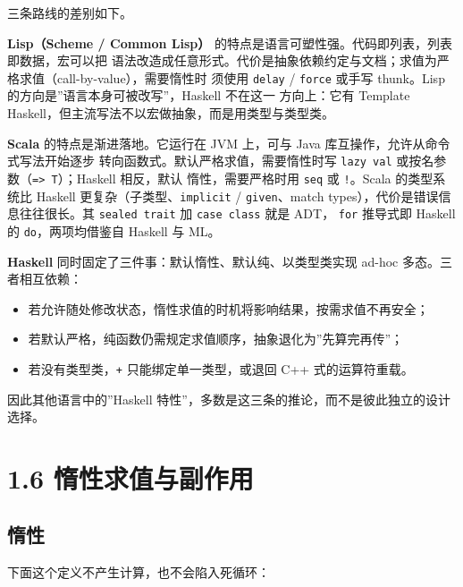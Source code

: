 三条路线的差别如下。

\textbf{Lisp（Scheme / Common Lisp）} 的特点是语言可塑性强。代码即列表，列表即数据，宏可以把
语法改造成任意形式。代价是抽象依赖约定与文档；求值为严格求值（call-by-value），需要惰性时
须使用 \passthrough{\lstinline!delay!} / \passthrough{\lstinline!force!} 或手写 thunk。Lisp 的方向是''语言本身可被改写''，Haskell 不在这一
方向上：它有 Template Haskell，但主流写法不以宏做抽象，而是用类型与类型类。

\textbf{Scala} 的特点是渐进落地。它运行在 JVM 上，可与 Java 库互操作，允许从命令式写法开始逐步
转向函数式。默认严格求值，需要惰性时写 \passthrough{\lstinline!lazy val!} 或按名参数（\passthrough{\lstinline!=> T!}）；Haskell 相反，默认
惰性，需要严格时用 \passthrough{\lstinline!seq!} 或 \passthrough{\lstinline"!"}。Scala 的类型系统比 Haskell 更复杂（子类型、\passthrough{\lstinline!implicit!} /
\passthrough{\lstinline!given!}、match types），代价是错误信息往往很长。其 \passthrough{\lstinline!sealed trait!} 加 \passthrough{\lstinline!case class!} 就是 ADT，
\passthrough{\lstinline!for!} 推导式即 Haskell 的 \passthrough{\lstinline!do!}，两项均借鉴自 Haskell 与 ML。

\textbf{Haskell} 同时固定了三件事：默认惰性、默认纯、以类型类实现 ad-hoc 多态。三者相互依赖：

\begin{itemize}
\tightlist
\item
  若允许随处修改状态，惰性求值的时机将影响结果，按需求值不再安全；
\item
  若默认严格，纯函数仍需规定求值顺序，抽象退化为''先算完再传''；
\item
  若没有类型类，\passthrough{\lstinline!+!} 只能绑定单一类型，或退回 C++ 式的运算符重载。
\end{itemize}

因此其他语言中的''Haskell 特性''，多数是这三条的推论，而不是彼此独立的设计选择。

\section{1.6 惰性求值与副作用}\label{ux60f0ux6027ux6c42ux503cux4e0eux526fux4f5cux7528}

\subsection{惰性}\label{ux60f0ux6027}

下面这个定义不产生计算，也不会陷入死循环：

